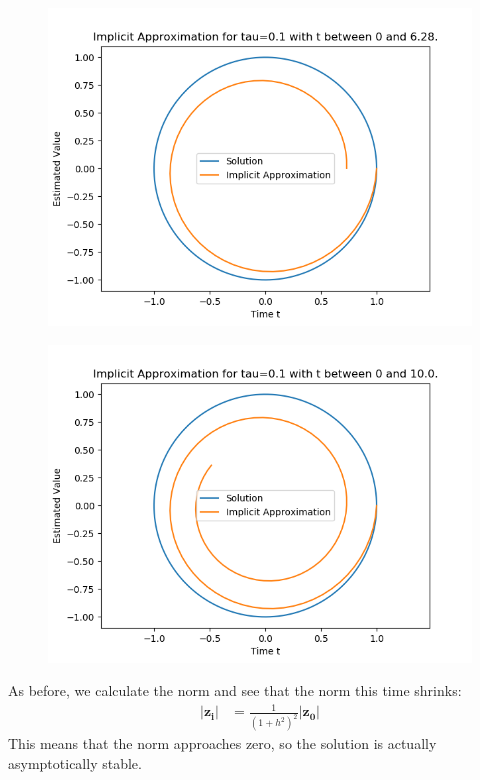 \documentclass{article}
\begin{document}
\begin{itemize}
		\begin{figure}[H]
			\includegraphics[scale=0.6]{implicitphase2p}
		\end{figure}
		\begin{figure}[H]
			\includegraphics[scale=0.6]{implicitphase10}
		\end{figure}

		As before, we calculate the norm and see that the norm this time
		shrinks:
		\begin{align*}
			|\mathbf{z_i}| &= \frac{1}{(1 + h^2)^2}|\mathbf{z_0}|
		\end{align*}
		This means that the norm approaches zero, so the solution is
		actually asymptotically stable.
\end{itemize}
\end{document}
